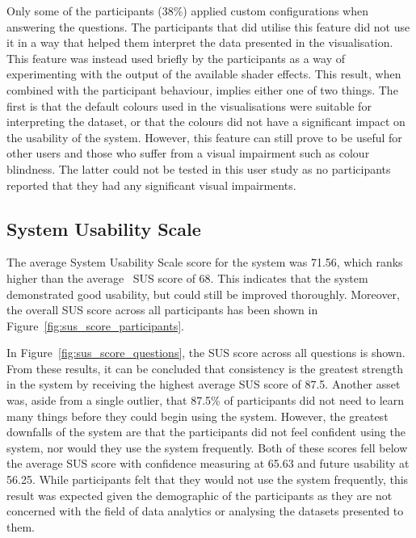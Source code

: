 {{		Only some of the participants (38\%) applied custom configurations when answering the questions. The participants that did utilise this feature did not use it in a way that helped them interpret the data presented in the visualisation. This feature was instead used briefly by the participants as a way of experimenting with the output of the available shader effects. This result, when combined with the participant behaviour, implies either one of two things. The first is that the default colours used in the visualisations were suitable for interpreting the dataset, or that the colours did not have a significant impact on the usability of the system. However, this feature can still prove to be useful for other users and those who suffer from a visual impairment such as colour blindness. The latter could not be tested in this user study as no participants reported that they had any significant visual impairments.

	}

	\subsection{System Usability Scale} {
	\label{sec:sus_results}

		The average System Usability Scale score for the system was 71.56, which ranks higher than the average~\parencite{brooke2013sus} SUS score of 68. This indicates that the system demonstrated good usability, but could still be improved thoroughly. Moreover, the overall SUS score across all participants has been shown in Figure~\ref{fig:sus_score_participants}.

		

		In Figure~\ref{fig:sus_score_questions}, the SUS score across all questions is shown. From these results, it can be concluded that consistency is the greatest strength in the system by receiving the highest average SUS score of 87.5. Another asset was, aside from a single outlier, that 87.5\% of participants did not need to learn many things before they could begin using the system. However, the greatest downfalls of the system are that the participants did not feel confident using the system, nor would they use the system frequently. Both of these scores fell below the average SUS score with confidence measuring at 65.63 and future usability at 56.25. While participants felt that they would not use the system frequently, this result was expected given the demographic of the participants as they are not concerned with the field of data analytics or analysing the datasets presented to them.

}}
